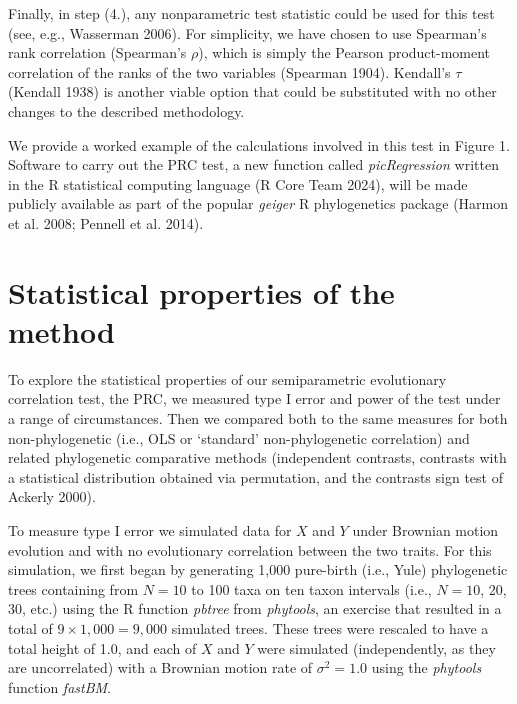 \documentclass[fleqn,10pt,lineno]{wlpeerj} %
\begin{document}
Finally, in step (4.), any nonparametric test statistic could be used for this test (see, e.g., Wasserman 2006). For simplicity, we have chosen to use Spearman's rank correlation (Spearman's \(\rho\)), which is simply the Pearson product-moment correlation of the ranks of the two variables (Spearman 1904). Kendall's \(\tau\) (Kendall 1938) is another viable option that could be substituted with no other changes to the described methodology.

We provide a worked example of the calculations involved in this test in Figure 1. Software to carry out the PRC test, a new function called \emph{picRegression} written in the R statistical computing language (R Core Team 2024), will be made publicly available as part of the popular \emph{geiger} R phylogenetics package (Harmon et al. 2008; Pennell et al. 2014).

\section{Statistical properties of the method}\label{statistical-properties-of-the-method}

To explore the statistical properties of our semiparametric evolutionary correlation test, the PRC, we measured type I error and power of the test under a range of circumstances. Then we compared both to the same measures for both non-phylogenetic (i.e., OLS or `standard' non-phylogenetic correlation) and related phylogenetic comparative methods (independent contrasts, contrasts with a statistical distribution obtained via permutation, and the contrasts sign test of Ackerly 2000).

To measure type I error we simulated data for \(X\) and \(Y\) under Brownian motion evolution and with no evolutionary correlation between the two traits. For this simulation, we first began by generating 1,000 pure-birth (i.e., Yule) phylogenetic trees containing from \(N=10\) to 100 taxa on ten taxon intervals (i.e., \(N=10\), 20, 30, etc.) using the R function \emph{pbtree} from \emph{phytools}, an exercise that resulted in a total of \(9 \times 1,000 = 9,000\) simulated trees. These trees were rescaled to have a total height of 1.0, and each of \(X\) and \(Y\) were simulated (independently, as they are uncorrelated) with a Brownian motion rate of \(\sigma^2 = 1.0\) using the \emph{phytools} function \emph{fastBM}.
\end{document}
